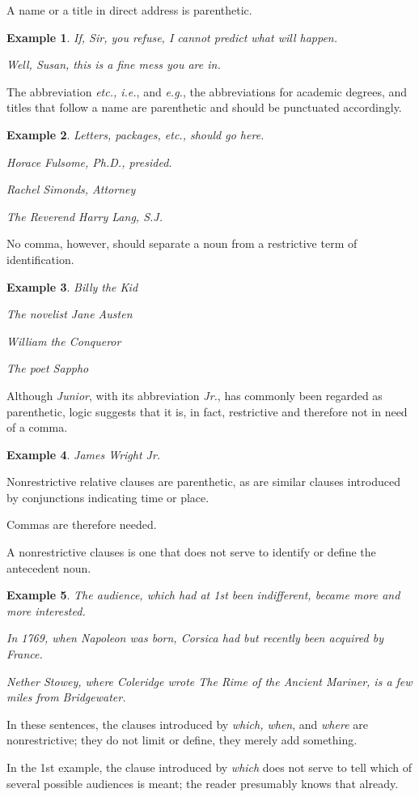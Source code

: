\documentclass{article}
\newtheorem{example}{Example}
\begin{document}
%
A name or a title in direct address is parenthetic.
\begin{example}
	If, Sir, you refuse, I cannot predict what will happen.
	
	Well, Susan, this is a fine mess you are in.
\end{example}
The abbreviation {\it etc., i.e.}, and {\it e.g.}, the abbreviations for academic degrees, and titles that follow a name are parenthetic and should be punctuated accordingly.
\begin{example}
	Letters, packages, etc., should go here.
	
	Horace Fulsome, Ph.D., presided.
	
	Rachel Simonds, Attorney
	
	The Reverend Harry Lang, S.J.
\end{example}
No comma, however, should separate a noun from a restrictive term of identification.
\begin{example}
	Billy the Kid
	
	The novelist Jane Austen
	
	William the Conqueror
	
	The poet Sappho
\end{example}
Although {\it Junior}, with its abbreviation {\it Jr.}, has commonly been regarded as parenthetic, logic suggests that it is, in fact, restrictive and therefore not in need of a comma.
\begin{example}
	James Wright Jr.
\end{example}
Nonrestrictive relative clauses are parenthetic, as are similar clauses introduced by conjunctions indicating time or place.

Commas are therefore needed.

A nonrestrictive clauses is one that does not serve to identify or define the antecedent noun.
\begin{example}
	The audience, which had at 1st been indifferent, became more and more interested.
	
	In 1769, when Napoleon was born, Corsica had but recently been acquired by France.
	
	Nether Stowey, where Coleridge wrote The Rime of the Ancient Mariner, is a few miles from Bridgewater.
\end{example}
In these sentences, the clauses introduced by {\it which, when}, and {\it where} are nonrestrictive; they do not limit or define, they merely add something.

In the 1st example, the clause introduced by {\it which} does not serve to tell which of several possible audiences is meant; the reader presumably knows that already.
\end{document}
